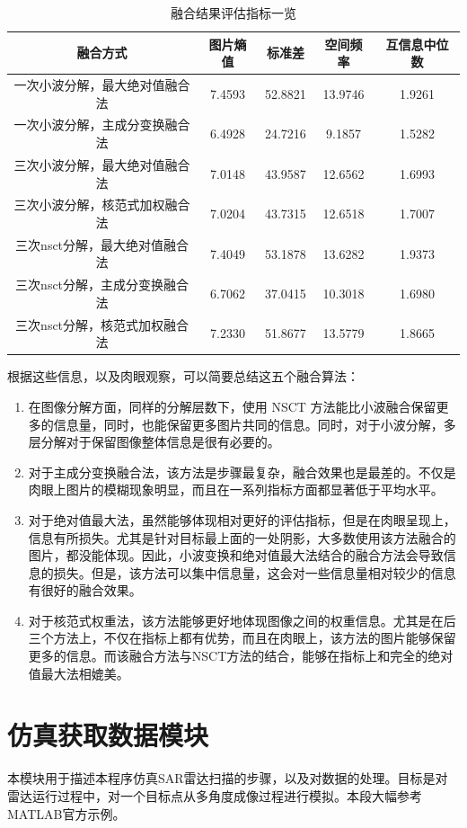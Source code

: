 \documentclass{xduugthesis}
\begin{document}
\begin{table}[h!]
	\begin{tabular}{|c|c|c|c|c|}
		\hline
		融合方式 & 图片熵值 & 标准差 & 空间频率 & 互信息中位数 \\
		\hline
		一次小波分解，最大绝对值融合法 & 7.4593 & 52.8821 & 13.9746 & 1.9261  \\
		\hline
		一次小波分解，主成分变换融合法 & 6.4928 & 24.7216 & 9.1857 & 1.5282  \\
		\hline
		三次小波分解，最大绝对值融合法 & 7.0148 & 43.9587 & 12.6562 & 1.6993 \\
		\hline
		三次小波分解，核范式加权融合法 & 7.0204 & 43.7315 & 12.6518 & 1.7007  \\
		\hline
		三次nsct分解，最大绝对值融合法 & 7.4049 & 53.1878 & 13.6282 & 1.9373 \\
		\hline
		三次nsct分解，主成分变换融合法 & 6.7062 & 37.0415 & 10.3018 & 1.6980 \\
		\hline
		三次nsct分解，核范式加权融合法 & 7.2330 & 51.8677 & 13.5779 & 1.8665 \\
		\hline
	\end{tabular}
	\caption{融合结果评估指标一览}
\end{table}\par
根据这些信息，以及肉眼观察，可以简要总结这五个融合算法：
\begin{enumerate}
	\item 在图像分解方面，同样的分解层数下，使用 NSCT 方法能比小波融合保留更多的信息量，同时，也能保留更多图片共同的信息。同时，对于小波分解，多层分解对于保留图像整体信息是很有必要的。
	\item 对于主成分变换融合法，该方法是步骤最复杂，融合效果也是最差的。不仅是肉眼上图片的模糊现象明显，而且在一系列指标方面都显著低于平均水平。
	\item 对于绝对值最大法，虽然能够体现相对更好的评估指标，但是在肉眼呈现上，信息有所损失。尤其是针对目标最上面的一处阴影，大多数使用该方法融合的图片，都没能体现。因此，小波变换和绝对值最大法结合的融合方法会导致信息的损失。但是，该方法可以集中信息量，这会对一些信息量相对较少的信息有很好的融合效果。
	\item 对于核范式权重法，该方法能够更好地体现图像之间的权重信息。尤其是在后三个方法上，不仅在指标上都有优势，而且在肉眼上，该方法的图片能够保留更多的信息。而该融合方法与NSCT方法的结合，能够在指标上和完全的绝对值最大法相媲美。
\end{enumerate}

\section{仿真获取数据模块}
本模块用于描述本程序仿真SAR雷达扫描的步骤，以及对数据的处理。目标是对雷达运行过程中，对一个目标点从多角度成像过程进行模拟。本段大幅参考MATLAB官方示例\cite{SAR_Simulation}。
\end{document}
